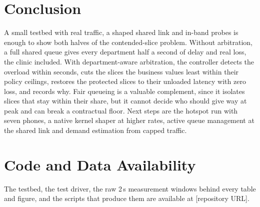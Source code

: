 \documentclass[conference]{IEEEtran}
\begin{document}
\section{Conclusion}

A small testbed with real traffic, a shaped shared link and in-band probes is enough to show both halves of the contended-slice problem. Without arbitration, a full shared queue gives every department half a second of delay and real loss, the clinic included. With department-aware arbitration, the controller detects the overload within seconds, cuts the slices the business values least within their policy ceilings, restores the protected slices to their unloaded latency with zero loss, and records why. Fair queueing is a valuable complement, since it isolates slices that stay within their share, but it cannot decide who should give way at peak and can break a contractual floor. Next steps are the hotspot run with seven phones, a native kernel shaper at higher rates, active queue management at the shared link and demand estimation from capped traffic.

\section*{Code and Data Availability}
The testbed, the test driver, the raw 2\,s measurement windows behind every table and figure, and the scripts that produce them are available at [repository URL].



\end{document}
